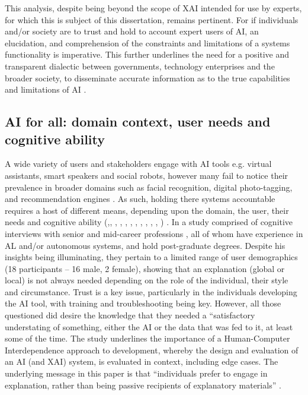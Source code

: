 This analysis, despite being beyond the scope of XAI intended for use by experts, for which this is subject of this dissertation, remains pertinent. For if individuals and/or society are to trust and hold to account expert users of AI, an elucidation, and comprehension of the constraints and limitations of a systems functionality is imperative. This further underlines the need for a positive and transparent dialectic between governments, technology enterprises and the broader society, to disseminate accurate information as to the true capabilities and limitations of AI \cite{worldeconomicforumPresidioRecommendationsResponsible2023}. 

\subsection{AI for all: domain context, user needs and cognitive ability}

A wide variety of users and stakeholders engage with AI tools e.g. virtual assistants, smart speakers and social robots, however many fail to notice their prevalence in broader domains such as facial recognition, digital photo-tagging, and recommendation engines \cite{zhangArtificialIntelligenceAmerican2019}. As such, holding there systems accountable requires a host of different means, depending upon the domain, the user, their needs and cognitive ability (\cite{goodmanEuropeanUnionRegulations2017a},\cite{amarasingheImportanceApplicationGroundedExperimental2023}, \cite{hoffmanEvaluatingMachinegeneratedExplanations2023}, \cite{hoffmanMeasuresExplainableAI2023}, \cite{jesusHowCanChoose2021}, \cite{mohseniMultidisciplinarySurveyFramework2021}, \cite{sovranoExplanatoryArtificialIntelligence2022}, \cite{wangChatCADInteractiveComputerAided2023}, \cite{zhangMayAskFollowup2023}, \cite{danksGovernanceExplainability2022}, \cite{hassijaInterpretingBlackBoxModels2023}, \cite{barredoarrietaExplainableArtificialIntelligence2020}) . In a study comprised of cognitive interviews with senior and mid-career professions \cite{hoffmanExplainableAIRoles2023}, all of whom have experience in AL and/or autonomous systems, and hold post-graduate degrees. Despite his insights being illuminating, they pertain to a limited range of user demographics (18 participants – 16 male, 2 female), showing that an explanation (global or local) is not always needed depending on the role of the individual, their style and circumstance. Trust is a key issue, particularly in the individuals developing the AI tool, with training and troubleshooting being key. However, all those questioned did desire the knowledge that they needed a “satisfactory understating of something, either the AI or the data that was fed to it, at least some of the time. The study underlines the importance of a Human-Computer Interdependence approach to development, whereby the design and evaluation of an AI (and XAI) system, is evaluated in context, including edge cases. The underlying message in this paper is that “individuals prefer to engage in explanation, rather than being passive recipients of explanatory materials” \cite{hoffmanExplainableAIRoles2023}.

